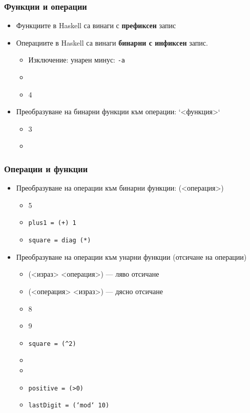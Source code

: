 \documentclass{beamer}
\begin{document}
\begin{frame}
  \frametitle{Функции и операции}
  \begin{itemize}[<+->]
  \item Функциите в Haskell са винаги с \textbf{префиксен} запис
  \item Операциите в Haskell са винаги \textbf{бинарни с инфиксен}
    запис.
    \begin{itemize}
    \item \alert{Изключение:} унарен минус: \tt{-a}
    \item {}
    \item {}4
    \end{itemize}
  \item Преобразуване на бинарни функции към операции: \tta`<функция>\tta`
    \begin{itemize}
    \item {}3
    \item {}
    \end{itemize}
  \end{itemize}
\end{frame}

\begin{frame}
  \frametitle{Операции и функции}
  \begin{itemize}[<+->]
  \item Преобразуване на операции към бинарни функции: \tta(<операция>\tta)
    \begin{itemize}
    \item {}5
    \item \tt{plus1 = (+) 1}
    \item \tt{square = diag (*)}
    \end{itemize}
  \item Преобразуване на операции към унарни функции (отсичане на операции)
    \begin{itemize}
    \item \tta(<израз> <операция>\tta) --- ляво отсичане
    \item \tta(<операция> <израз>\tta) --- дясно отсичане
    \item {}8
    \item {}9
    \item \tt{square = (\^{}2)}
    \item {}
    \item {}
    \item \tt{positive = (>0)}
    \item \tt{lastDigit = (`mod` 10)}
    \end{itemize}
  \end{itemize}
\end{frame}
\end{document}
